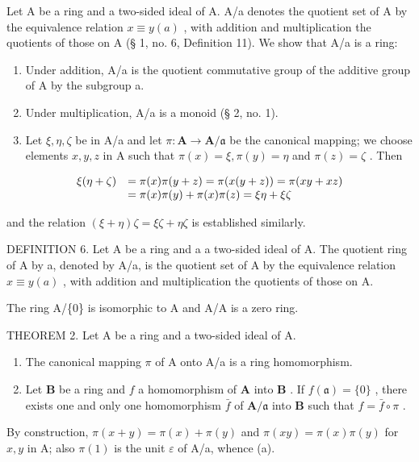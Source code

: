 Let A be a ring and a two-sided ideal of A. A/a denotes the quotient set of A by the equivalence relation \(x \equiv y(a)\) , with addition and multiplication the quotients of those on A (§ 1, no. 6, Definition 11). We show that A/a is a ring:

\begin{enumerate}
\def\labelenumi{(\alph{enumi})}
\item
  Under addition, A/a is the quotient commutative group of the additive group of A by the subgroup a.
\item
  Under multiplication, A/a is a monoid (§ 2, no. 1).
\item
  Let \(\xi, \eta, \zeta\) be in A/a and let \(\pi: \mathbf{A} \to \mathbf{A}/\mathfrak{a}\) be the canonical mapping; we choose elements \(x, y, z\) in A such that \(\pi(x) = \xi, \pi(y) = \eta\) and \(\pi(z) = \zeta\) . Then
\end{enumerate}

\[
\begin{array}{r l} \xi (\eta + \zeta) & = \pi (x) \pi (y + z) = \pi (x (y + z)) = \pi (x y + x z) \\ & = \pi (x) \pi (y) + \pi (x) \pi (z) = \xi \eta + \xi \zeta \end{array}
\]

and the relation \((\xi + \eta)\zeta = \xi \zeta + \eta \zeta\) is established similarly.

DEFINITION 6. Let A be a ring and a a two-sided ideal of A. The quotient ring of A by a, denoted by A/a, is the quotient set of A by the equivalence relation \(x \equiv y(a)\) , with addition and multiplication the quotients of those on A.

The ring A/\{0\} is isomorphic to A and A/A is a zero ring.

THEOREM 2. Let A be a ring and a two-sided ideal of A.

\begin{enumerate}
\def\labelenumi{(\alph{enumi})}
\item
  The canonical mapping \(\pi\) of A onto A/a is a ring homomorphism.
\item
  Let \(\mathbf{B}\) be a ring and \(f\) a homomorphism of \(\mathbf{A}\) into \(\mathbf{B}\) . If \(f(\mathfrak{a}) = \{0\}\) , there exists one and only one homomorphism \(\bar{f}\) of \(\mathbf{A} / \mathfrak{a}\) into \(\mathbf{B}\) such that \(f = \bar{f} \circ \pi\) .
\end{enumerate}

By construction, \(\pi(x + y) = \pi(x) + \pi(y)\) and \(\pi(xy) = \pi(x)\pi(y)\) for \(x, y\) in A; also \(\pi(1)\) is the unit \(\varepsilon\) of A/a, whence (a).

